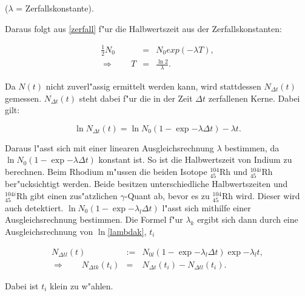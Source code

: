 		\begin{center}
				\tiny{($\lambda$ = Zerfallskonstante).}
		\end{center}

		Daraus folgt aus \eqref{zerfall} f"ur die Halbwertszeit aus der Zerfallskonstanten:

		\begin{eqnarray}
			\frac{1}{2} N_0 &=& N_0 exp{(-\lambda T)}, \nonumber \\
			\Rightarrow \qquad T &=& \frac{\ln{2}}{\lambda}.
			\label{eqn:t_halb}
		\end{eqnarray}

		Da $N(t)$ nicht zuverl"assig ermittelt werden kann, wird stattdessen $N_{\Delta t}(t)$ gemessen. 
		$N_{\Delta t}(t)$ steht dabei f"ur die in der Zeit $\Delta t$ zerfallenen Kerne.
		Dabei gilt:

		\begin{equation}
			\ln{N_{\Delta t}(t)} = \ln{N_0 (1 - \exp{-\lambda \Delta t})} - \lambda t.
		\end{equation}
		
		Daraus l"asst sich mit einer linearen Ausgleichsrechnung $\lambda$ bestimmen, da $\ln{N_0 (1 - \exp{-\lambda \Delta t})}$ konstant ist.
		So ist die Halbwertszeit von Indium zu berechnen.
		Beim Rhodium m"ussen die beiden Isotope $^{104}_{45}\mathrm{Rh}$ und $^{104i}_{45}\mathrm{Rh}$ ber"ucksichtigt werden.
		Beide besitzen unterschiedliche Halbwertszeiten und $^{104i}_{45}\mathrm{Rh}$ gibt einen zus"atzlichen $\gamma$-Quant ab, bevor es zu $^{104}_{45}\mathrm{Rh}$ wird.
		Dieser wird auch detektiert.
		$\ln{N_0 (1 - \exp{-\lambda_l \Delta t})}$ l"asst sich mithilfe einer Ausgleichsrechnung bestimmen.
		Die Formel f"ur $\lambda_k$ ergibt sich dann durch eine Ausgleichsrechnung von {$\ln$\eqref{lambdak}, $t_i$}

		\begin{eqnarray}
			N_{\Delta tl}(t) &:=& N_{0l} (1-\exp{-\lambda_l \Delta t})\exp{-\lambda_l t},\nonumber\\
			\Rightarrow \qquad N_{\Delta tk}(t_i) &=& N_{\Delta t}(t_i) - N_{\Delta tl}(t_i). \label{lambdak}
		\end{eqnarray}

		Dabei ist $t_i$ klein zu w"ahlen.